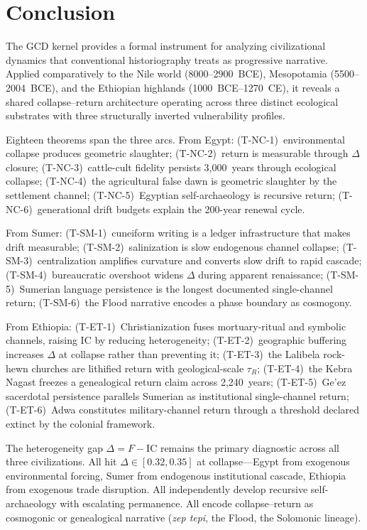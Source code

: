 \documentclass[
  aps,
  prd,
  twocolumn,
  superscriptaddress,
  nofootinbib,
  floatfix
]{revtex4-2}
\newcommand{\tR}{\tau_{\!R}}
\newcommand{\IC}{\mathrm{IC}}
\begin{document}
\section{Conclusion}\label{sec:conclusion}

The GCD kernel provides a formal instrument for
analyzing civilizational dynamics that conventional
historiography treats as progressive narrative.
Applied comparatively to the Nile world
(8000--2900~BCE), Mesopotamia (5500--2004~BCE),
and the Ethiopian highlands (1000~BCE--1270~CE),
it reveals a shared collapse--return architecture
operating across three distinct ecological substrates
with three structurally inverted vulnerability
profiles.

Eighteen theorems span the three arcs.  From Egypt:
(T-NC-1)~environmental collapse produces geometric
slaughter; (T-NC-2)~return is measurable through
$\Delta$ closure; (T-NC-3)~cattle-cult fidelity
persists 3,000~years through ecological collapse;
(T-NC-4)~the agricultural false dawn is geometric
slaughter by the settlement channel;
(T-NC-5)~Egyptian self-archaeology is recursive
return; (T-NC-6)~generational drift budgets explain
the 200-year renewal cycle.

From Sumer: (T-SM-1)~cuneiform writing is a ledger
infrastructure that makes drift measurable;
(T-SM-2)~salinization is slow endogenous channel
collapse; (T-SM-3)~centralization amplifies curvature
and converts slow drift to rapid cascade;
(T-SM-4)~bureaucratic overshoot widens $\Delta$
during apparent renaissance; (T-SM-5)~Sumerian
language persistence is the longest documented
single-channel return; (T-SM-6)~the Flood narrative
encodes a phase boundary as cosmogony.

From Ethiopia: (T-ET-1)~Christianization fuses
mortuary-ritual and symbolic channels, raising $\IC$
by reducing heterogeneity; (T-ET-2)~geographic
buffering increases $\Delta$ at collapse rather than
preventing it; (T-ET-3)~the Lalibela rock-hewn
churches are lithified return with geological-scale
$\tR$; (T-ET-4)~the Kebra Nagast freezes a
genealogical return claim across 2,240~years;
(T-ET-5)~Ge'ez sacerdotal persistence parallels
Sumerian as institutional single-channel return;
(T-ET-6)~Adwa constitutes military-channel return
through a threshold declared extinct by the colonial
framework.

The heterogeneity gap $\Delta = F - \IC$ remains
the primary diagnostic across all three
civilizations.  All hit $\Delta \in [0.32, 0.35]$
at collapse---Egypt from exogenous environmental
forcing, Sumer from endogenous institutional
cascade, Ethiopia from exogenous trade disruption.
All independently develop recursive self-archaeology
with escalating permanence.  All encode
collapse--return as cosmogonic or genealogical
narrative (\emph{zep tepi}, the Flood, the
Solomonic lineage).
\end{document}
